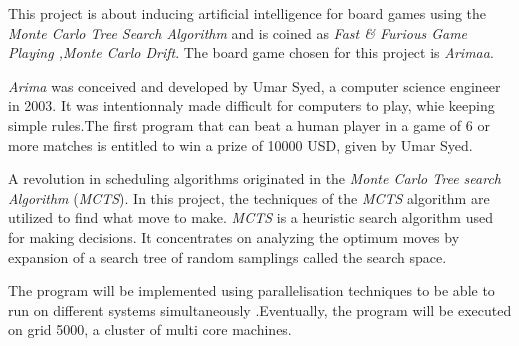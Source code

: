 This project is about inducing artificial intelligence for board games using the \emph{Monte Carlo Tree Search Algorithm} and is coined as \emph{Fast \& Furious Game Playing ,Monte Carlo Drift}. The board game chosen for this project is \emph{Arimaa}.
\newline

\emph{Arima} was conceived and developed by Umar Syed, a computer science engineer in 2003. It was intentionnaly made difficult for computers to play, whie keeping simple rules.The first program that can beat a human player in a game of 6 or more matches is entitled to win a prize of 10000 USD, given by Umar Syed.
\newline

A revolution in scheduling algorithms originated in the \emph{Monte Carlo Tree search Algorithm} (\emph{MCTS}). In this project, the techniques of the \emph{MCTS} algorithm are utilized to find what move to make. \emph{MCTS} is a heuristic search algorithm used for making decisions. It concentrates on analyzing the optimum moves by expansion of a search tree of random samplings called the search space.
\newline

The program will be implemented using parallelisation techniques to be able to run on different systems simultaneously .Eventually, the program will be executed on grid 5000, a cluster of multi core machines.